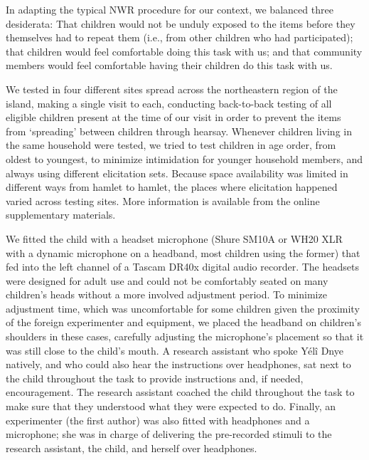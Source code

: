 \documentclass[
  american,
  ,man,floatsintext]{apa6}
\begin{document}
In adapting the typical NWR procedure for our context, we balanced three desiderata: That children would not be unduly exposed to the items before they themselves had to repeat them (i.e., from other children who had participated); that children would feel comfortable doing this task with us; and that community members would feel comfortable having their children do this task with us.

We tested in four different sites spread across the northeastern region of the island, making a single visit to each, conducting back-to-back testing of all eligible children present at the time of our visit in order to prevent the items from `spreading' between children through hearsay. Whenever children living in the same household were tested, we tried to test children in age order, from oldest to youngest, to minimize intimidation for younger household members, and always using different elicitation sets. Because space availability was limited in different ways from hamlet to hamlet, the places where elicitation happened varied across testing sites. More information is available from the online supplementary materials.

We fitted the child with a headset microphone (Shure SM10A or WH20 XLR with a dynamic microphone on a headband, most children using the former) that fed into the left channel of a Tascam DR40x digital audio recorder. The headsets were designed for adult use and could not be comfortably seated on many children's heads without a more involved adjustment period. To minimize adjustment time, which was uncomfortable for some children given the proximity of the foreign experimenter and equipment, we placed the headband on children's shoulders in these cases, carefully adjusting the microphone's placement so that it was still close to the child's mouth. A research assistant who spoke Yélî Dnye natively, and who could also hear the instructions over headphones, sat next to the child throughout the task to provide instructions and, if needed, encouragement. The research assistant coached the child throughout the task to make sure that they understood what they were expected to do. Finally, an experimenter (the first author) was also fitted with headphones and a microphone; she was in charge of delivering the pre-recorded stimuli to the research assistant, the child, and herself over headphones.
\end{document}
